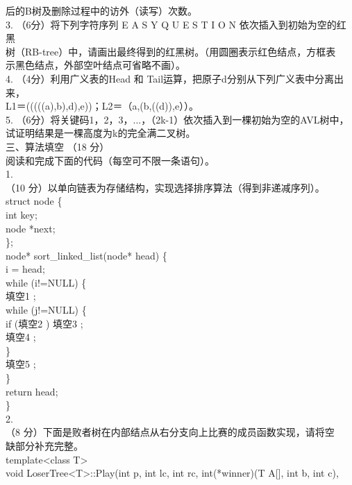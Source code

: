 \begin{question}
后的B树及删除过程中的访外（读写）次数。\\
3. （6分）将下列字符序列 E A S Y Q U E S T I O N 依次插入到初始为空的红黑\\
树（RB-tree）中，请画出最终得到的红黑树。（用圆圈表示红色结点，方框表\\
示黑色结点，外部空叶结点可省略不画）。\\
4. （4分）利用广义表的Head 和 Tail运算，把原子d分别从下列广义表中分离出来，\\
L1＝(((((a),b),d),e))；L2＝（a,(b,((d)),e））。\\
5. （6分）将关键码1，2，3，...，（2k-1）依次插入到一棵初始为空的AVL树中，\\
试证明结果是一棵高度为k的完全满二叉树。\\
三、算法填空 （18 分）\\
阅读和完成下面的代码（每空可不限一条语句）。\\
1.\\
（10 分）以单向链表为存储结构，实现选择排序算法（得到非递减序列）。\\
struct node \{\\
int key;\\
node *next;\\
\};\\
node* sort\_linked\_list(node* head) \{\\
i = head;\\
while (i!=NULL) \{\\
填空1 \underline{\hspace{12em}};\\
while (j!=NULL) \{\\
if (填空2 \underline{\hspace{12em}})   填空3 \underline{\hspace{12em}};\\
填空4 \underline{\hspace{12em}};\\
\}\\
填空5 \underline{\hspace{12em}};\\
\}\\
return head;\\
\}\\
2.\\
（8 分）下面是败者树在内部结点从右分支向上比赛的成员函数实现，请将空\\
缺部分补充完整。\\
template<class T>\\
void LoserTree<T>::Play(int p, int lc, int rc, int(*winner)(T A[], int b, int c),\\

\end{question}
